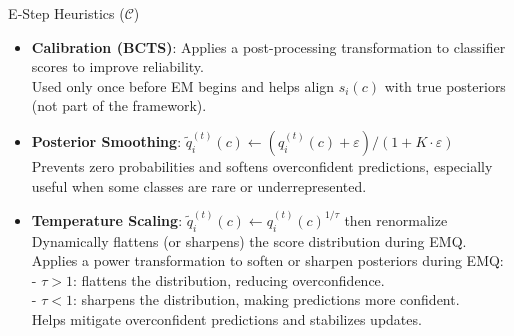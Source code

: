 \documentclass[aspectratio=169]{beamer}
\begin{document}
\begin{frame}{E‑Step Heuristics ($\mathcal{C}$)}
  \begin{itemize}
    \item \textbf{Calibration (BCTS)}: Applies a post-processing transformation to classifier scores to improve reliability.\\
    \small Used only once before EM begins and helps align $s_i(c)$ with true posteriors (not part of the framework).
    \normalsize

    \item \textbf{Posterior Smoothing}: $\tilde{q}_i^{(t)}(c)\! \leftarrow\! ({q}_i^{(t)}(c)+\varepsilon)/(1+K\cdot\varepsilon)$\\
    \small Prevents zero probabilities and softens overconfident predictions, especially useful when some classes are rare or underrepresented.
    \normalsize

    \item \textbf{Temperature Scaling}: $\tilde{q}_i^{(t)}(c) \leftarrow q_i^{(t)}(c)^{1/\tau}$ then renormalize\\
    \small Dynamically flattens (or sharpens) the score distribution during EMQ. 
    \small Applies a power transformation to soften or sharpen posteriors during EMQ:\\
    - \( \tau > 1 \): flattens the distribution, reducing overconfidence.\\
    - \( \tau < 1 \): sharpens the distribution, making predictions more confident.\\Helps mitigate overconfident predictions and stabilizes updates.
  \end{itemize}
\end{frame}
\end{document}
